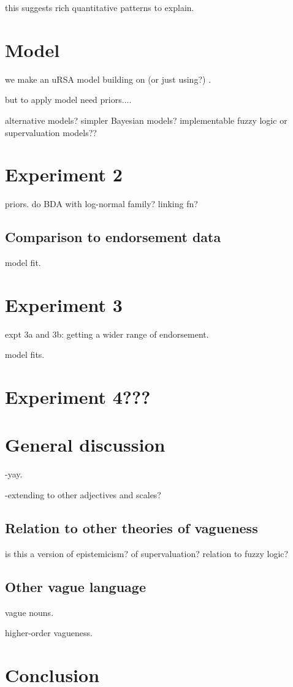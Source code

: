 \documentclass[11pt]{amsart}
\begin{document}
this suggests rich quantitative patterns to explain.

\section{Model}
\label{model}

we make an uRSA model building on (or just using?) \cite{lassiter2015}.

but to apply model need priors....

alternative models? simpler Bayesian models? implementable fuzzy logic or supervaluation models??

\section{Experiment 2}
\label{priors}
priors. do BDA with log-normal family? linking fn?

\subsection{Comparison to endorsement data}
model fit. 

\section{Experiment 3}
\label{exp3}

expt 3a and 3b: getting a wider range of endorsement. 

model fits.

\section{Experiment 4???}

\section{General discussion}
\label{gd}

  -yay. 
  
  -extending to other adjectives and scales?
  
 \subsection{Relation to other theories of vagueness}
  
is this a version of epistemicism? of supervaluation? relation to fuzzy logic?
  
\subsection{Other vague language}

vague nouns. 

higher-order vagueness.

\section{Conclusion}
\end{document}
